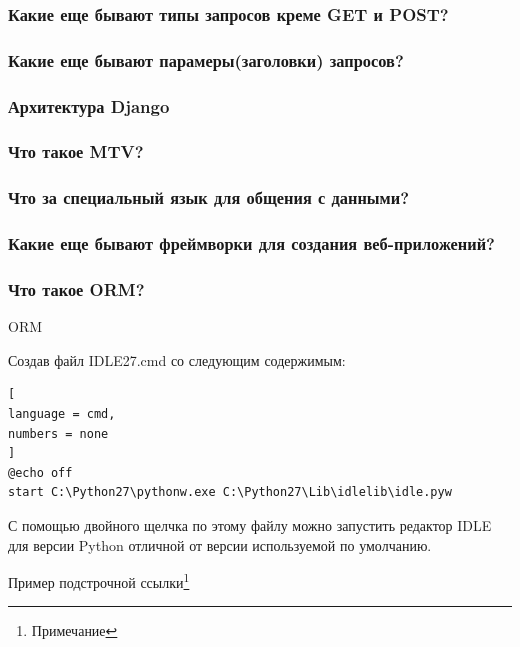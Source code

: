 \documentclass[%
	11pt,
	a4paper,
	utf8,
		]{article}
\begin{document}
\subsubsection{Какие еще бывают типы запросов креме GET и POST?}

\subsubsection{Какие еще бывают парамеры(заголовки) запросов?}

\subsubsection{Архитектура Django}

\subsubsection{Что такое MTV?}

\subsubsection{Что за специальный язык для общения с данными?}

\subsubsection{Какие еще бывают фреймворки для создания веб-приложений?}

\subsubsection{Что такое ORM?}

ORM


Создав файл IDLE27.cmd со следующим содержимым:
\begin{lstlisting}[
language = cmd,
numbers = none
]
@echo off
start C:\Python27\pythonw.exe C:\Python27\Lib\idlelib\idle.pyw
\end{lstlisting}


С помощью двойного щелчка по этому файлу можно запустить редактор IDLE для версии Python отличной от версии используемой по умолчанию.




\cite[стр.~34]{chacon:2020}


Пример подстрочной ссылки\footnote{Примечание}






\begin{thebibliography}{99}
	
\end{thebibliography}

\end{document}
